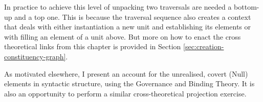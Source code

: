In practice to achieve this level of unpacking two traversals are needed a bottom-up and a top one. This is because the traversal sequence also creates a context that deals with either instantiation a new unit and establishing its elements or with filling an element of a unit above. But more on how to enact the cross theoretical links from this chapter is provided in Section \ref{sec:creation-constituency-graph}.


As motivated elsewhere, I present an account for the unrealised, covert (Null) elements in syntactic structure, using the Governance and Binding Theory. It is also an opportunity to perform a similar cross-theoretical projection exercise.

%
%
%
